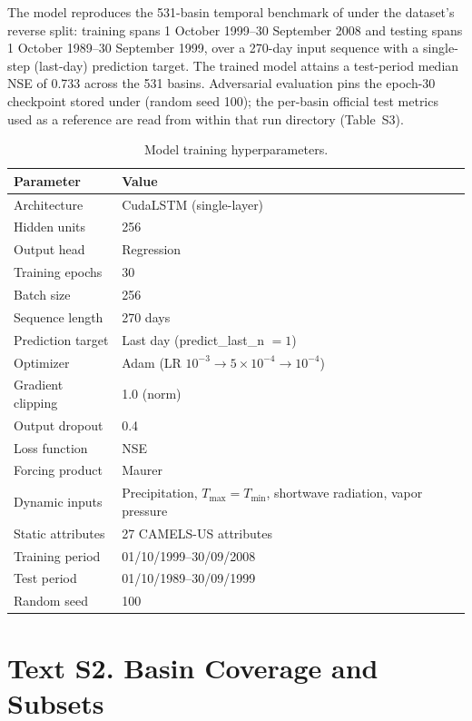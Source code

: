 \documentclass[final]{agujournal2019}
\begin{document}
The model reproduces the 531-basin temporal benchmark of  under the dataset's reverse split: training spans 1 October 1999--30 September 2008 and testing spans 1 October 1989--30 September 1999, over a 270-day input sequence with a single-step (last-day) prediction target. The trained model attains a test-period median NSE of 0.733 across the 531 basins. Adversarial evaluation pins the epoch-30 checkpoint stored under  (random seed 100); the per-basin official test metrics used as a reference are read from  within that run directory (Table~S3).

\begin{table}[ht]
\caption{Model training hyperparameters.}
\label{tab:s1_hyperparams}
\centering
\small
\begin{tabular}{ll}
\toprule
Parameter & Value \\
\midrule
Architecture & CudaLSTM (single-layer) \\
Hidden units & 256 \\
Output head & Regression \\
Training epochs & 30 \\
Batch size & 256 \\
Sequence length & 270 days \\
Prediction target & Last day (predict\_last\_n $=1$) \\
Optimizer & Adam (LR $10^{-3}\!\to\!5\times10^{-4}\!\to\!10^{-4}$) \\
Gradient clipping & 1.0 (norm) \\
Output dropout & 0.4 \\
Loss function & NSE \\
Forcing product & Maurer \\
Dynamic inputs & Precipitation, $T_{\max}{=}T_{\min}$, shortwave radiation, vapor pressure \\
Static attributes & 27 CAMELS-US attributes \\
Training period & 01/10/1999--30/09/2008 \\
Test period & 01/10/1989--30/09/1999 \\
Random seed & 100 \\
\bottomrule
\end{tabular}
\end{table}

\section*{Text S2. Basin Coverage and Subsets}
\end{document}
